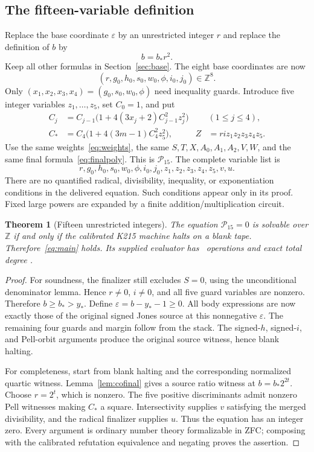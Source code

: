 \documentclass[11pt]{article}
\newtheorem{theorem}{Theorem}[section]
\theoremstyle{definition}\newtheorem{definition}[theorem]{Definition}
\newcommand{\Z}{\mathbb Z}\newcommand{\N}{\mathbb N}\newcommand{\Q}{\mathbb Q}
\begin{document}
\subsection{The fifteen-variable definition}
Replace the base coordinate $\varepsilon$ by an unrestricted integer $r$ and replace the definition of $b$ by
\begin{equation}\label{eq:squarebase}
 b=b_*r^2.
\end{equation}
Keep all other formulas in Section~\ref{sec:base}. The eight base coordinates are now
\[
 (r,g_0,h_0,s_0,w_0,\phi,i_0,j_0)\in\Z^8.
\]
Only $(x_1,x_2,x_3,x_4)=(g_0,s_0,w_0,\phi)$ need inequality guards. Introduce five integer variables $z_1,\ldots,z_5$, set $C_0=1$, and put
\begin{align*}
 C_j&=C_{j-1}\bigl(1+4(3x_j+2)C_{j-1}^2z_j^2\bigr)
            &&(1\le j\le4),\\
 C_*&=C_4\bigl(1+4(3m-1)C_4^2z_5^2\bigr),
 &Z&=ri z_1z_2z_3z_4z_5.
\end{align*}
Use the same weights~\eqref{eq:weights}, the same $S,T,X,A_0,A_1,A_2,V,W$, and the same final formula~\eqref{eq:finalpoly}. This is $\mathcal P_{15}$.
The complete variable list is
\[
 \boxed{r,g_0,h_0,s_0,w_0,\phi,i_0,j_0,z_1,z_2,z_3,z_4,z_5,v,u.}
\]
There are no quantified radical, divisibility, inequality, or exponentiation conditions in the delivered equation. Such conditions appear only in its proof. Fixed large powers are expanded by a finite addition/multiplication circuit.

\begin{theorem}[Fifteen unrestricted integers]\label{thm:15}
The equation $\mathcal P_{15}=0$ is solvable over $\Z$ if and only if the calibrated K215 machine halts on a blank tape. Therefore~\eqref{eq:main} holds. Its supplied evaluator has \OpsFifteen\ operations and exact total degree \DegreeFifteenFormula.
\end{theorem}
\begin{proof}
For soundness, the finalizer still excludes $S=0$, using the unconditional denominator lemma. Hence $r\ne0$, $i\ne0$, and all five guard variables are nonzero. Therefore $b\ge b_*>y_*$. Define
$\varepsilon=b-y_*-1\ge0$. All body expressions are now exactly those of the original signed Jones source at this nonnegative $\varepsilon$. The remaining four guards and margin follow from the stack. The signed-$h$, signed-$i$, and Pell-orbit arguments produce the original source witness, hence blank halting.

For completeness, start from blank halting and the corresponding normalized quartic witness. Lemma~\ref{lem:cofinal} gives a source ratio witness at $b=b_*2^{2t}$. Choose $r=2^t$, which is nonzero. The five positive discriminants admit nonzero Pell witnesses making $C_*$ a square. Intersectivity supplies $v$ satisfying the merged divisibility, and the radical finalizer supplies $u$. Thus the equation has an integer zero. Every argument is ordinary number theory formalizable in ZFC; composing with the calibrated refutation equivalence and negating proves the assertion.
\end{proof}
\end{document}
